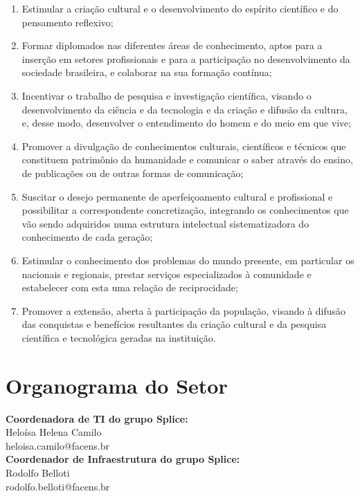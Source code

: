 \documentclass[
	12pt,				%
	oneside,			%
	a4paper,			%
	chapter=TITLE,		%
	section=TITLE,		%
	sumario=tradicional %
	english,			%
	french,				%
	spanish,			%
	brazil				%
	]{abntex2}
\begin{document}
\begin{enumerate}
	\item Estimular a criação cultural e o desenvolvimento do espírito científico e do pensamento reflexivo;
	\item Formar diplomados nas diferentes áreas de conhecimento, aptos para a inserção em setores profissionais e para a participação no desenvolvimento da sociedade brasileira, e colaborar na sua formação contínua;
	\item Incentivar o trabalho de pesquisa e investigação científica, visando o desenvolvimento da ciência e da tecnologia e da criação e difusão da cultura, e, desse modo, desenvolver o entendimento do homem e do meio em que vive;
	\item Promover a divulgação de conhecimentos culturais, científicos e técnicos que constituem patrimônio da humanidade e comunicar o saber através do ensino, de publicações ou de outras formas de comunicação;
	\item Suscitar o desejo permanente de aperfeiçoamento cultural e profissional e possibilitar a correspondente concretização, integrando os conhecimentos que vão sendo adquiridos numa estrutura intelectual sistematizadora do conhecimento de cada geração;
	\item Estimular o conhecimento dos problemas do mundo presente, em particular os nacionais e regionais, prestar serviços especializados à comunidade e estabelecer com esta uma relação de reciprocidade;
	\item Promover a extensão, aberta à participação da população, visando à difusão das conquistas e benefícios resultantes da criação cultural e da pesquisa científica e tecnológica geradas na instituição.
\end{enumerate}

\section{Organograma do Setor}
\label{sec:aempresa}
\textbf{Coordenadora de TI do grupo Splice:} \\ \indent  Heloísa Helena Camilo \\
\indent heloisa.camilo@facens.br \\

\textbf{Coordenador de Infraestrutura do grupo Splice:} \\ \indent Rodolfo Belloti \\
\indent rodolfo.belloti@facens.br \\
\end{document}
